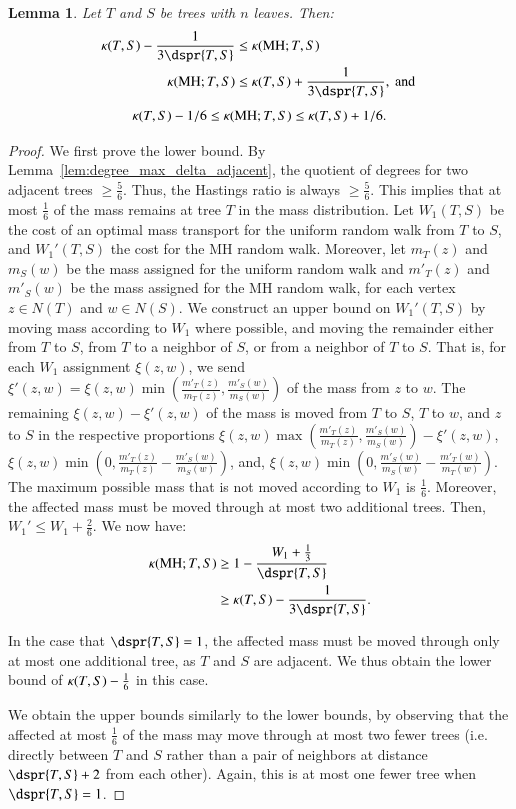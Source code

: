 \documentclass[]{elsarticle}
\newtheorem{lem}[thm]{Lemma}
\newcommand{\MH}{\operatorname{MH}}
\newcommand{\curvature}[2][]{%
    \ifthenelse{\equal{#1}{}}%
		{\kappa(#2)}%
		{\kappa_{#1}(#2)}%
}
\begin{document}
\begin{lem}
	\label{lem:mh_curvature}
	Let $T$ and $S$ be trees with $n$ leaves. Then:
	\begin{align*}
	\curvature{T,S} - \frac{1}{3\dspr{T,S}}
	&\le \curvature{\MH; T,S} \\
	\curvature{\MH; T,S}
	&\le \curvature{T,S} + \frac{1}{3\dspr{T,S}},\text{ and }
\end{align*}
	$$\curvature{T,S} - 1/6
	\le \curvature{\MH; T,S}
	\le \curvature{T,S} + 1/6 .$$
\end{lem}
\begin{proof}
	We first prove the lower bound.
	By Lemma~\ref{lem:degree_max_delta_adjacent}, the quotient of degrees for two adjacent trees $\ge \frac{5}{6}$.
	Thus, the Hastings ratio is always $\ge \frac{5}{6}$.
	This implies that at most $\frac{1}{6}$ of the mass remains at tree $T$ in the mass distribution.
	Let $W_1(T,S)$ be the cost of an optimal mass transport for the uniform random walk from $T$ to $S$, and $W_1'(T,S)$ the cost for the MH random walk.
	Moreover, let $m_T(z)$ and $m_S(w)$ be the mass assigned for the uniform random walk and $m'_T(z)$ and $m'_S(w)$ be the mass assigned for the MH random walk, for each vertex $z \in N(T)$ and $w \in N(S)$.
	We construct an upper bound on $W_1'(T,S)$ by moving mass according to $W_1$ where possible, and moving the remainder either from $T$ to $S$, from $T$ to a neighbor of $S$, or from a neighbor of $T$ to $S$.
	That is, for each $W_1$ assignment $\xi(z,w)$, we send $\xi'(z,w) = \xi(z,w) \min\left(\frac{m'_T(z)}{m_T(z)}, \frac{m'_S(w)}{m_S(w)}\right)$ of the mass from $z$ to $w$.
	The remaining $\xi(z,w) - \xi'(z,w)$ of the mass is moved from $T$ to $S$, $T$ to $w$, and $z$ to $S$ in the respective proportions
	$\xi(z,w) \max\left(\frac{m'_T(z)}{m_T(z)}, \frac{m'_S(w)}{m_S(w)}\right) - \xi'(z,w)$,
	$\xi(z,w) \min\left(0, \frac{m'_T(z)}{m_T(z)} - \frac{m'_S(w)}{m_S(w)}\right)$, and,
	$\xi(z,w) \min\left(0, \frac{m'_S(w)}{m_S(w)} - \frac{m'_T(w)}{m_T(w)}\right)$.
	The maximum possible mass that is not moved according to $W_1$ is $\frac{1}{6}$.
	Moreover, the affected mass must be moved through at most two additional trees.
	Then, $W_1' \le W_1 + \frac{2}{6}$.
	We now have:
	\begin{align*}
		\curvature{\MH; T,S} & \ge 1 - \frac{W_1 + \frac{1}{3}}{\dspr{T,S}} \\
		& \ge \curvature{T,S} - \frac{1}{3\dspr{T,S}}.
	\end{align*}

	In the case that $\dspr{T,S}=1$, the affected mass must be moved through only at most one additional tree, as $T$ and $S$ are adjacent.
	We thus obtain the lower bound of $\curvature{T,S} - \frac{1}{6}$ in this case.

	We obtain the upper bounds similarly to the lower bounds, by observing that the affected at most $\frac{1}{6}$ of the mass may move through at most two fewer trees (i.e. directly between $T$ and $S$ rather than a pair of neighbors at distance $\dspr{T,S} + 2$ from each other).
	Again, this is at most one fewer tree when $\dspr{T,S}=1$.
\end{proof}
\end{document}
